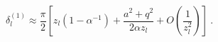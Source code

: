 \begin{equation}
\label{delta1}
\delta_l^{(1)}\approx \frac\pi2\left[z_l(1-\alpha^{-1})+\frac{a^2+q^2}
{2\alpha z_l}+O\left(\frac1{z_l^2}\right)\right] \ .
\end{equation}

